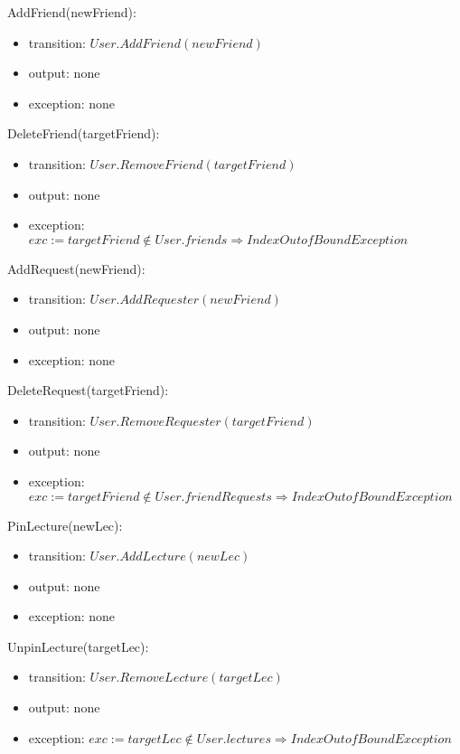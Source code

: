 \documentclass[12pt, titlepage]{article}
\begin{document}
\noindent AddFriend(newFriend):
\begin{itemize}
\item transition: $User.AddFriend(newFriend)$ 
\item output: none
\item exception: none
\end{itemize}

\noindent DeleteFriend(targetFriend):
\begin{itemize}
\item transition: $User.RemoveFriend(targetFriend)$ 
\item output: none
\item exception: $exc := targetFriend \notin User.friends \Rightarrow IndexOutofBound Exception$
\end{itemize}

\noindent AddRequest(newFriend):
\begin{itemize}
\item transition: $User.AddRequester(newFriend)$ 
\item output: none
\item exception: none
\end{itemize}

\noindent DeleteRequest(targetFriend):
\begin{itemize}
\item transition: $User.RemoveRequester(targetFriend)$ 
\item output: none
\item exception: $exc := targetFriend \notin User.friendRequests \Rightarrow IndexOutofBound Exception$
\end{itemize}

\noindent PinLecture(newLec):
\begin{itemize}
\item transition: $User.AddLecture(newLec)$ 
\item output: none
\item exception: none
\end{itemize}

\noindent UnpinLecture(targetLec):
\begin{itemize}
\item transition: $User.RemoveLecture(targetLec)$ 
\item output: none
\item exception: $exc := targetLec \notin User.lectures \Rightarrow IndexOutofBound Exception$
\end{itemize}
\end{document}
